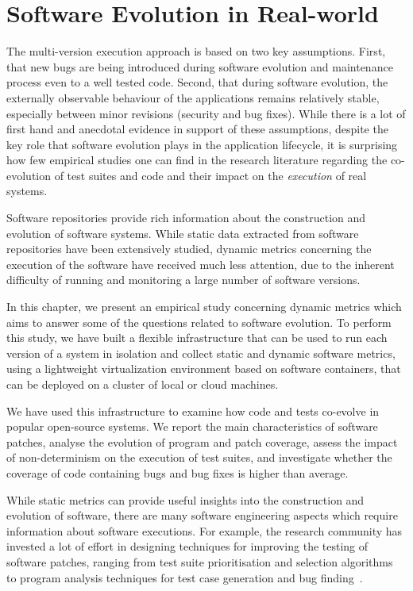 \chapter{Software Evolution in Real-world}
\label{chap:evolution}

The multi-version execution approach is based on two key assumptions.  First,
that new bugs are being introduced during software evolution and maintenance
process even to a well tested code. Second, that during software evolution,
the externally observable behaviour of the applications remains relatively
stable, especially between minor revisions (\ie security and bug fixes).
While there is a lot of first hand and anecdotal evidence in support of these
assumptions, despite the key role that software evolution plays in the
application lifecycle, it is surprising how few empirical studies one can find
in the research literature regarding the co-evolution of test suites and code
and their impact on the \emph{execution} of real systems.

Software repositories provide rich information about the construction and
evolution of software systems. While static data extracted from software
repositories have been extensively studied, dynamic metrics concerning the
execution of the software have received much less attention, due to the
inherent difficulty of running and monitoring a large number of software
versions.

In this chapter, we present an empirical study concerning dynamic metrics which
aims to answer some of the questions related to software evolution. To perform
this study, we have built a flexible infrastructure that can be used to run
each version of a system in isolation and collect static and dynamic software
metrics, using a lightweight virtualization environment based on software
containers, that can be deployed on a cluster of local or cloud machines.

We have used this infrastructure to examine how code and tests co-evolve in
\numSystems popular open-source systems. We report the main characteristics of
software patches, analyse the evolution of program and patch coverage, assess
the impact of non-determinism on the execution of test suites, and investigate
whether the coverage of code containing bugs and bug fixes is higher than
average.

While static metrics can provide useful insights into the construction and
evolution of software, there are many software engineering aspects which
require information about software executions.  For example, the research
community has invested a lot of effort in designing techniques for improving
the testing of software patches, ranging from test suite prioritisation and
selection
algorithms~\cite{harrold:test-redundancy,test-pri,Rothermel96analyzingregression}
to program analysis techniques for test case generation and bug
finding~\cite{diff-symex,directed-test-augmen:09,express,directed-symex11,babic11,directed-incr-symex11,patch:spin12,interaction-changes13}.

